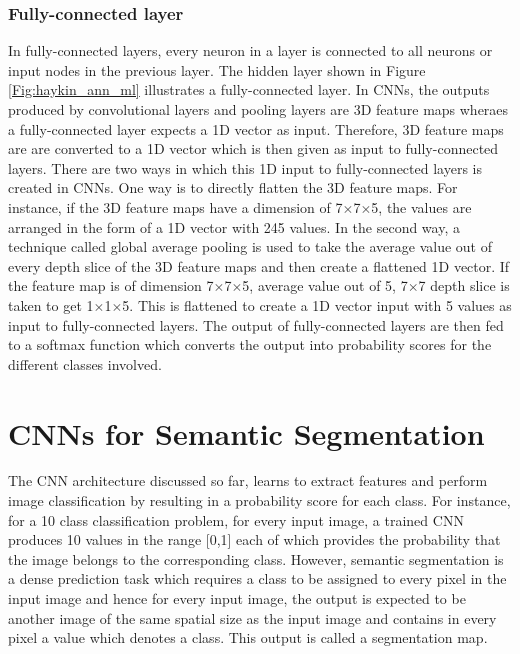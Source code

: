 \subsubsection{Fully-connected layer}

In fully-connected layers, every neuron in a layer is connected to all neurons or input nodes in the previous layer. The hidden layer shown in Figure \ref{Fig:haykin_ann_ml} illustrates a fully-connected layer. In CNNs, the outputs produced by convolutional layers and pooling layers are 3D feature maps wheraes a fully-connected layer expects a 1D vector as input. Therefore, 3D feature maps are are converted to a 1D vector which is then given as input to fully-connected layers. There are two ways in which this 1D input to fully-connected layers is created in CNNs. One way is to directly flatten the 3D feature maps. For instance, if the 3D feature maps have a dimension of 7$\times$7$\times$5, the values are arranged in the form of a 1D vector with 245 values. In the second way, a technique called global average pooling is used to take the average value out of every depth slice of the 3D feature maps and then create a flattened 1D vector. If the feature map is of dimension 7$\times$7$\times$5, average value out of 5, 7$\times$7 depth slice is taken to get 1$\times$1$\times$5. This is flattened to create a 1D vector input with 5 values as input to fully-connected layers. The output of fully-connected layers are then fed to a softmax function which converts the output into probability scores for the different classes involved.

\section{CNNs for Semantic Segmentation}
\label{section:cnnseg}

The CNN architecture discussed so far, learns to extract features and perform image classification by resulting in a probability score for each class. For instance, for a 10 class classification problem, for every input image, a trained CNN produces 10 values in the range [0,1] each of which provides the probability that the image belongs to the corresponding class. However, semantic segmentation is a dense prediction task which requires a class to be assigned to every pixel in the input image and hence for every input image, the output is expected to be another image of the same spatial size as the input image and contains in every pixel a value which denotes a class. This output is called a segmentation map. 

